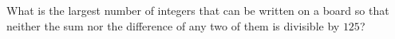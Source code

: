 What is the largest number of integers that can be written on a board so that neither the sum nor the difference of any two of them is divisible by $125$?
